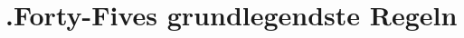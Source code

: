 
\section{.Forty-Fives grundlegendste Regeln}\label{sec:grundlegenste-regeln}

\renewcommand{\kapitelautor}{Autor: Irgendwer} %

%
%

\renewcommand{\kapitelautor}{}
